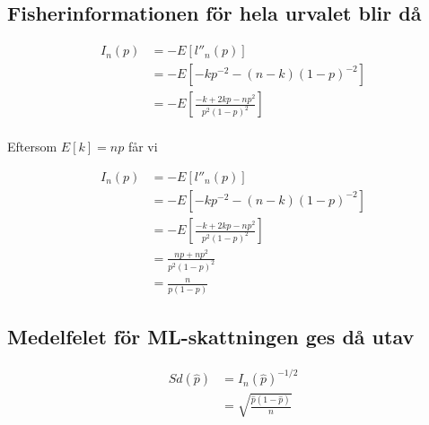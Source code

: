 \documentclass[
]{article}
\begin{document}
\hypertarget{fisherinformationen-fuxf6r-hela-urvalet-blir-duxe5}{%
\subsection{Fisherinformationen för hela urvalet blir
då}\label{fisherinformationen-fuxf6r-hela-urvalet-blir-duxe5}}

\[
\begin{aligned}
I_n(p) &= - E[l''_n(p)] \\
             &= -E[-kp^{-2} - (n - k)(1 - p)^{-2}] \\
             &= -E[\frac{-k + 2kp - np^2}{p^2(1-p)^2}] \\
\end{aligned}
\]

Eftersom \(E[k] = np\) får vi

\[
\begin{aligned}
I_n(p) &= - E[l''_n(p)] \\
             &= -E[-kp^{-2} - (n - k)(1 - p)^{-2}] \\
             &= -E[\frac{-k + 2kp - np^2}{p^2(1-p)^2}] \\
             &= \frac{np + np^2}{p^2(1-p)^2} \\
             &= \frac{n}{p(1-p)}
\end{aligned}
\]

\hypertarget{medelfelet-fuxf6r-ml-skattningen-ges-duxe5-utav-1}{%
\subsection{Medelfelet för ML-skattningen ges då
utav}\label{medelfelet-fuxf6r-ml-skattningen-ges-duxe5-utav-1}}

\[
\begin{aligned}
Sd(\hat p) &= I_n(\hat p)^{-1/2} \\
                &= \sqrt{\frac{\hat p(1-\hat p)}{n}} \\
\end{aligned}
\]
\end{document}
